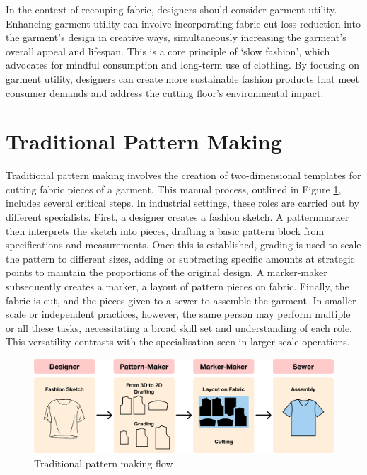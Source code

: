 In the context of recouping fabric, designers should consider garment utility. Enhancing garment utility can involve incorporating fabric cut loss reduction into the garment's design in creative ways, simultaneously increasing the garment's overall appeal and lifespan. This is a core principle of `slow fashion', which advocates for mindful consumption and long-term use of clothing. By focusing on garment utility, designers can create more sustainable fashion products that meet consumer demands and address the cutting floor's environmental impact.

\section{Traditional Pattern Making}
Traditional pattern making involves the creation of two-dimensional templates for cutting fabric pieces of a garment. This manual process, outlined in Figure \ref{fig:traditional_making_flow}, includes several critical steps. In industrial settings, these roles are carried out by different specialists. First, a designer creates a fashion sketch. A patternmarker then interprets the sketch into pieces, drafting a basic pattern block from specifications and measurements. Once this is established, grading is used to scale the pattern to different sizes, adding or subtracting specific amounts at strategic points to maintain the proportions of the original design. A marker-maker subsequently creates a marker, a layout of pattern pieces on fabric. Finally, the fabric is cut, and the pieces given to a sewer to assemble the garment. In smaller-scale or independent practices, however, the same person may perform multiple or all these tasks, necessitating a broad skill set and understanding of each role. This versatility contrasts with the specialisation seen in larger-scale operations.
\begin{figure} [htb]
    \centering
    \includegraphics[width=\textwidth]{Images/pattern make diagram.png}
    \caption{Traditional pattern making flow}
    \label{fig:traditional_making_flow}
\end{figure}
